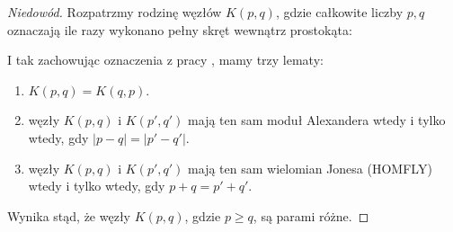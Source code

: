 \begin{proof}[Niedowód]
    Rozpatrzmy rodzinę węzłów $K(p, q)$, gdzie całkowite liczby $p, q$ oznaczają ile razy wykonano pełny skręt wewnątrz prostokąta:

    I tak zachowując oznaczenia z pracy \cite{kanenobu1986}, mamy trzy lematy:
    \begin{enumerate}
        \item $K(p,q) = K(q,p)$.
        \item węzły $K(p,q)$ i $K(p', q')$ mają ten sam moduł Alexandera wtedy i tylko wtedy, gdy $|p-q| = |p'-q'|$.
        \item węzły $K(p,q)$ i $K(p', q')$ mają ten sam wielomian Jonesa (HOMFLY) wtedy i tylko wtedy, gdy $p+q = p'+q'$.
    \end{enumerate}
    Wynika stąd, że węzły $K(p, q)$, gdzie $p \ge q$, są parami różne.
 

\end{proof}
